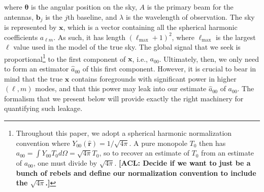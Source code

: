 \documentclass[twolcolumn,apj,iop,numberedappendix]{emulateapj}
\newcommand{\Q}{\mathbf{Q}}
\newcommand{\acl}[1]{{\color{red} \textbf{[ACL:  #1]}}}
\begin{document}
where $\boldsymbol \theta$ is the angular position on the sky, $A$ is the primary beam for the antennas, $\mathbf{b_{\textit{j}}}$ is the $j$th baseline, and $\lambda$ is the wavelength of observation. The sky is represented by $\mathbf{x}$, which is a vector containing all the spherical harmonic coefficients $a_{\ell m}$. As such, it has length $(\ell_{\textrm{max}}+1)^2$, where $\ell_{\textrm{max}}$ is the largest $\ell$ value used in the model of the true sky. The global signal that we seek is proportional\footnote{Throughout this paper, we adopt a spherical harmonic normalization convention where $Y_{00} (\mathbf{\hat{r}}) = 1/ \sqrt{4\pi}$. A pure monopole $T_0$ then has $a_{00} = \int Y_{00} T_0 d\Omega = \sqrt{4\pi} T_0$, so to recover an estimate of $T_0$ from an estimate of $a_{00}$, one must divide by $\sqrt{4 \pi}$. \acl{Decide if we want to just be a bunch of rebels and define our normalization convention to include the $\sqrt{4\pi}$.}} to the first component of $\mathbf{x}$, i.e., $a_{00}$. Ultimately, then, we only need to form an estimator $\hat{a}_{00}$ of this first component. However, it is crucial to bear in mind that the true $\mathbf{x}$ contains foregrounds with significant power in higher $(\ell, m)$ modes, and that this power may leak into our estimate $\hat{a}_{00}$ of $a_{00}$. The formalism that we present below will provide exactly the right machinery for quantifying such leakage.
%
\end{document}
